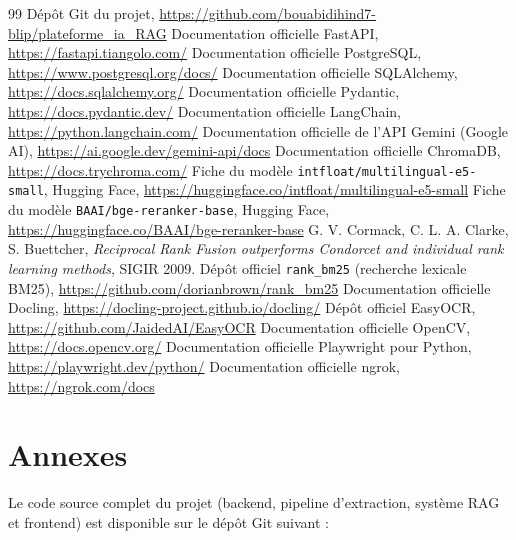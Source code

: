 \documentclass[12pt,a4paper]{report}
\begin{document}
\begin{thebibliography}{99}
     Dépôt Git du projet, \url{https://github.com/bouabidihind7-blip/plateforme_ia_RAG}
     Documentation officielle FastAPI, \url{https://fastapi.tiangolo.com/}
     Documentation officielle PostgreSQL, \url{https://www.postgresql.org/docs/}
     Documentation officielle SQLAlchemy, \url{https://docs.sqlalchemy.org/}
     Documentation officielle Pydantic, \url{https://docs.pydantic.dev/}
     Documentation officielle LangChain, \url{https://python.langchain.com/}
     Documentation officielle de l'API Gemini (Google AI), \url{https://ai.google.dev/gemini-api/docs}
     Documentation officielle ChromaDB, \url{https://docs.trychroma.com/}
     Fiche du modèle \texttt{intfloat/multilingual-e5-small}, Hugging Face, \url{https://huggingface.co/intfloat/multilingual-e5-small}
     Fiche du modèle \texttt{BAAI/bge-reranker-base}, Hugging Face, \url{https://huggingface.co/BAAI/bge-reranker-base}
     G. V. Cormack, C. L. A. Clarke, S. Buettcher, \emph{Reciprocal Rank Fusion outperforms Condorcet and individual rank learning methods}, SIGIR 2009.
     Dépôt officiel \texttt{rank\_bm25} (recherche lexicale BM25), \url{https://github.com/dorianbrown/rank_bm25}
     Documentation officielle Docling, \url{https://docling-project.github.io/docling/}
     Dépôt officiel EasyOCR, \url{https://github.com/JaidedAI/EasyOCR}
     Documentation officielle OpenCV, \url{https://docs.opencv.org/}
     Documentation officielle Playwright pour Python, \url{https://playwright.dev/python/}
     Documentation officielle ngrok, \url{https://ngrok.com/docs}
\end{thebibliography}

\appendix
\chapter{Annexes}

Le code source complet du projet (backend, pipeline d'extraction,
système RAG et frontend) est disponible sur le dépôt Git suivant :
\end{document}
